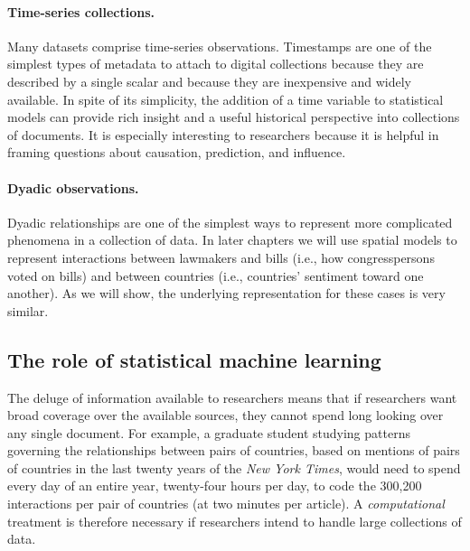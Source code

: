 \paragraph{Time-series collections.}  Many datasets comprise
time-series observations.  Timestamps are one of the simplest types of
metadata to attach to digital collections because they are described
by a single scalar and because they are inexpensive and widely
available.  In spite of its simplicity, the addition of a time
variable to statistical models can provide rich insight and a useful
historical perspective into collections of documents.  It is
especially interesting to researchers because it is helpful in framing
questions about causation, prediction, and influence.

\paragraph{Dyadic observations.}  Dyadic relationships are one of the
simplest ways to represent more complicated phenomena in a collection
of data. In later chapters we will use spatial models to represent
interactions between lawmakers and bills (i.e., how congresspersons voted
on bills) and between countries (i.e., countries' sentiment
toward one another).  As we will show, the underlying representation
for these cases is very similar.

\subsection*{The role of statistical machine learning}

The deluge of information available to researchers means that if
researchers want broad coverage over the available sources, they
cannot spend long looking over any single document.  For example, a
graduate student studying patterns governing the relationships between
pairs of countries, based on mentions of pairs of countries in the
last twenty years of the \emph{New York Times}, would need to spend
every day of an entire year, twenty-four hours per day, to code the
300,200 interactions per pair of countries (at two minutes per
article).  A \emph{computational} treatment is therefore necessary if
researchers intend to handle large collections of data.



